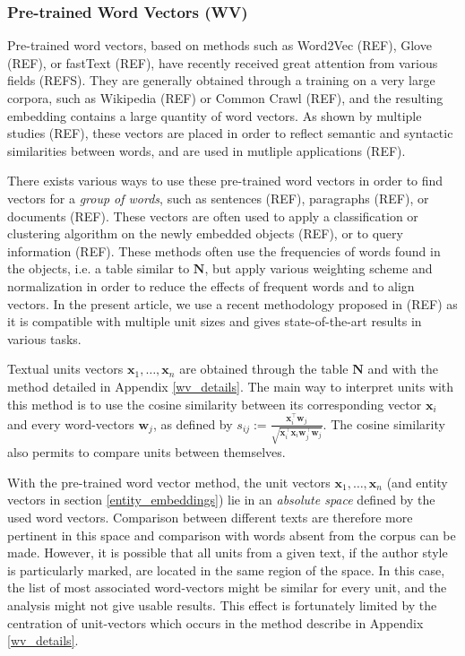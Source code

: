 \documentclass[
twocolumn,
]{ceurart}
\begin{document}
\subsubsection{Pre-trained Word Vectors (WV)}
\label{wv_method}

Pre-trained word vectors, based on methods such as Word2Vec (REF), Glove (REF), or fastText (REF), have recently received great attention from various fields (REFS). They are generally obtained through a training on a very large corpora, such as Wikipedia (REF) or Common Crawl (REF), and the resulting embedding contains a large quantity of word vectors. As shown by multiple studies (REF), these vectors are placed in order to reflect semantic and syntactic similarities between words, and are used in mutliple applications (REF). 

There exists various ways to use these pre-trained word vectors in order to find vectors for a \emph{group of words}, such as sentences (REF), paragraphs (REF), or documents (REF). These vectors are often used to apply a classification or clustering algorithm on the newly embedded objects (REF), or to query information (REF). These methods often use the frequencies of words found in the objects, i.e. a table similar to $\mathbf{N}$, but apply various weighting scheme and normalization in order to reduce the effects of frequent words and to align vectors. In the present article, we use a recent methodology proposed in (REF) as it is compatible with multiple unit sizes and gives state-of-the-art results in various tasks. 

Textual units vectors $\mathbf{x}_1, \ldots, \mathbf{x}_n$ are obtained through the table $\mathbf{N}$ and with the method detailed in Appendix \ref{wv_details}. The main way to interpret units with this method is to use the cosine similarity between its corresponding vector $\mathbf{x}_i$ and every word-vectors $\mathbf{w}_j$, as defined by $s_{ij} := \frac{\mathbf{x}_i^\top \mathbf{w}_j}{\sqrt{\mathbf{x}_i^\top \mathbf{x}_i \mathbf{w}_j^\top \mathbf{w}_j}}$. The cosine similarity also permits to compare units between themselves.

With the pre-trained word vector method, the unit vectors $\mathbf{x}_1, \ldots, \mathbf{x}_n$ (and entity vectors in section \ref{entity_embeddings}) lie in an \emph{absolute space} defined by the used word vectors. Comparison between different texts are therefore more pertinent in this space and comparison with words absent from the corpus can be made. However, it is possible that all units from a given text, if the author style is particularly marked, are located in the same region of the space. In this case, the list of most associated word-vectors might be similar for every unit, and the analysis might not give usable results. This effect is fortunately limited by the centration of unit-vectors which occurs in the method describe in Appendix \ref{wv_details}.
\end{document}

